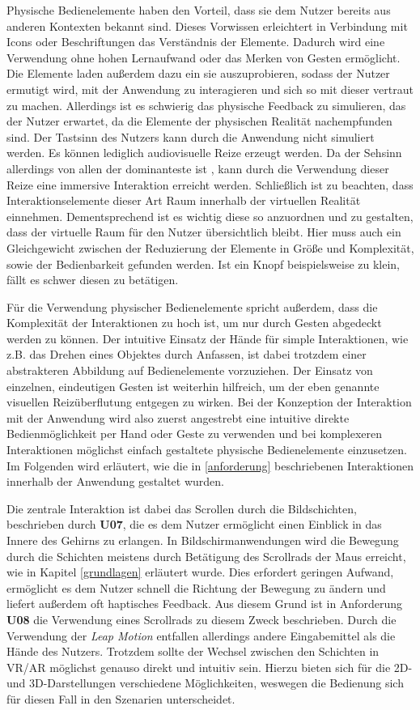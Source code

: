 Physische Bedienelemente haben den Vorteil, dass sie dem Nutzer bereits aus anderen Kontexten bekannt sind. Dieses Vorwissen erleichtert in Verbindung mit Icons oder Beschriftungen das Verständnis der Elemente. 
Dadurch wird eine Verwendung ohne hohen Lernaufwand oder das Merken von Gesten ermöglicht. 
Die Elemente laden außerdem dazu ein sie auszuprobieren, sodass der Nutzer ermutigt wird, mit der Anwendung zu interagieren und sich so mit dieser vertraut zu machen. 
Allerdings ist es schwierig das physische Feedback zu simulieren, das der Nutzer erwartet, da die Elemente der physischen Realität nachempfunden sind. Der Tastsinn des Nutzers kann durch die Anwendung nicht simuliert werden. Es können lediglich audiovisuelle Reize erzeugt werden. Da der Sehsinn allerdings von allen der dominanteste ist \cite{Azmandian16}, kann durch die Verwendung dieser Reize eine immersive Interaktion erreicht werden. 
Schließlich ist zu beachten, dass Interaktionselemente dieser Art Raum innerhalb der virtuellen Realität einnehmen. Dementsprechend ist es wichtig diese so anzuordnen und zu gestalten, dass der virtuelle Raum für den Nutzer übersichtlich bleibt. Hier muss auch ein Gleichgewicht zwischen der Reduzierung der Elemente in Größe und Komplexität, sowie der Bedienbarkeit gefunden werden. Ist ein Knopf beispielsweise zu klein, fällt es schwer diesen zu betätigen. 

Für die Verwendung physischer Bedienelemente spricht außerdem, dass die Komplexität der Interaktionen zu hoch ist, um nur durch Gesten abgedeckt werden zu können. Der intuitive Einsatz der Hände für simple Interaktionen, wie z.B. das Drehen eines Objektes durch Anfassen, ist dabei trotzdem einer abstrakteren Abbildung auf Bedienelemente vorzuziehen. Der Einsatz von einzelnen, eindeutigen Gesten ist weiterhin hilfreich, um der eben genannte visuellen Reizüberflutung entgegen zu wirken. 
Bei der Konzeption der Interaktion mit der Anwendung wird also zuerst angestrebt eine intuitive direkte Bedienmöglichkeit per Hand oder Geste zu verwenden und bei komplexeren Interaktionen möglichst einfach gestaltete physische Bedienelemente einzusetzen.
Im Folgenden wird erläutert, wie die in \ref{anforderung} beschriebenen Interaktionen innerhalb der Anwendung gestaltet wurden.

Die zentrale Interaktion ist dabei das Scrollen durch die Bildschichten, beschrieben durch \textbf{U07}, die es dem Nutzer ermöglicht einen Einblick in das Innere des Gehirns zu erlangen. In Bildschirmanwendungen wird die Bewegung durch die Schichten meistens durch Betätigung des Scrollrads der Maus erreicht, wie in Kapitel \ref{grundlagen} erläutert wurde.
Dies erfordert geringen Aufwand, ermöglicht es dem Nutzer schnell die Richtung der Bewegung zu ändern und liefert außerdem oft haptisches Feedback. 
Aus diesem Grund ist in Anforderung \textbf{U08} die Verwendung eines Scrollrads zu diesem Zweck beschrieben. Durch die Verwendung der \textit{Leap Motion} entfallen allerdings andere Eingabemittel als die Hände des Nutzers.
Trotzdem sollte der Wechsel zwischen den Schichten in VR/AR möglichst genauso direkt und intuitiv sein. 
Hierzu bieten sich für die 2D- und 3D-Darstellungen verschiedene Möglichkeiten, weswegen die Bedienung sich für diesen Fall in den Szenarien unterscheidet. 


